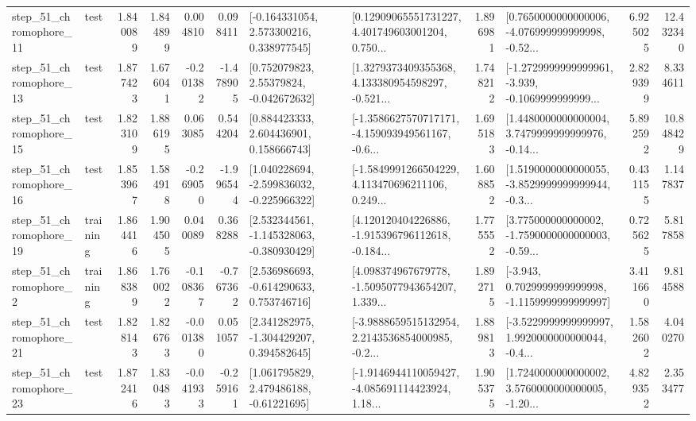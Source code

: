 \begin{tabular}{llrrrrllrlrr}
   step\_51\_chromophore\_11 &      test &      1.840089 &    1.844899 &      0.004810 &  0.098411 &    [-0.164331054, 2.573300216, 0.338977545] &  [0.12909065551731227, 4.401749603001204, 0.750... &       1.896981 &  [0.7650000000000006, -4.076999999999998, -0.52... &            6.925025 &         12.432340 \\
   step\_51\_chromophore\_13 &      test &      1.877423 &    1.676041 &     -0.201382 & -1.478905 &     [0.752079823, 2.55379824, -0.042672632] &  [1.3279373409355368, 4.133380954598297, -0.521... &       1.748212 &  [-1.2729999999999961, -3.939, -0.1069999999999... &            2.829399 &          8.334611 \\
   step\_51\_chromophore\_15 &      test &      1.823109 &    1.886195 &      0.063085 &  0.544204 &     [0.884423333, 2.604436901, 0.158666743] &  [-1.3586627570717171, -4.159093949561167, -0.6... &       1.695183 &  [1.4480000000000004, 3.7479999999999976, -0.14... &            5.892592 &         10.848429 \\
   step\_51\_chromophore\_16 &      test &      1.853967 &    1.584918 &     -0.269050 & -1.996544 &   [1.040228694, -2.599836032, -0.225966322] &  [-1.5849991266504229, 4.113470696211106, 0.249... &       1.608852 &  [1.5190000000000055, -3.8529999999999944, -0.3... &            0.431155 &          1.147837 \\
   step\_51\_chromophore\_19 &  training &      1.864416 &    1.904505 &      0.040089 &  0.368288 &   [2.532344561, -1.145328063, -0.380930429] &  [4.120120404226886, -1.915396796112618, -0.184... &       1.775552 &  [3.775000000000002, -1.7590000000000003, -0.59... &            0.725625 &          5.817858 \\
    step\_51\_chromophore\_2 &  training &      1.868389 &    1.760022 &     -0.108367 & -0.767362 &    [2.536986693, -0.614290633, 0.753746716] &  [4.098374967679778, -1.5095077943654207, 1.339... &       1.892715 &  [-3.943, 0.7029999999999998, -1.1159999999999997] &            3.411660 &          9.814588 \\
   step\_51\_chromophore\_21 &      test &      1.828143 &    1.826763 &     -0.001380 &  0.051057 &    [2.341282975, -1.304429207, 0.394582645] &  [-3.9888659515132954, 2.2143536854000985, -0.2... &       1.889813 &  [-3.5229999999999997, 1.9920000000000044, -0.4... &            1.582602 &          4.040270 \\
   step\_51\_chromophore\_23 &      test &      1.872416 &    1.830483 &     -0.041933 & -0.259161 &     [1.061795829, 2.479486188, -0.61221695] &  [-1.9146944110059427, -4.085691114423924, 1.18... &       1.905375 &  [1.7240000000000002, 3.5760000000000005, -1.20... &            4.829352 &          2.353477 \\

\end{tabular}
